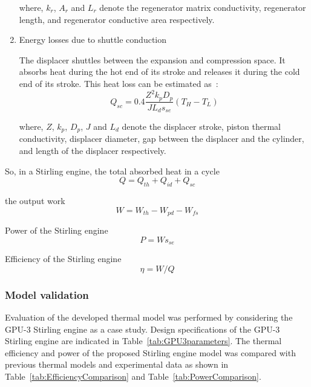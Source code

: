 \begin{enumerate}
where, $k_r$, $A_r$ and $L_r$ denote the regenerator matrix conductivity, regenerator length, and regenerator conductive area respectively.

\item Energy losses due to shuttle conduction

The displacer shuttles between the expansion and compression space. It absorbs heat during the hot end of its stroke and releases it during the cold end of its stroke. This heat loss can be estimated as~\cite{Timoumi2008}:
\begin{equation}
	Q_{sc} = 0.4\frac{Z^2k_pD_p}{JL_ds_{se}}(T_{H} - T_{L})
\end{equation}

where, $Z$, $k_p$, $D_p$, $J$ and $L_d$ denote the displacer stroke, piston thermal conductivity, displacer diameter, gap between the displacer and the cylinder, and length of the displacer respectively.

\end{enumerate}

So, in a Stirling engine, the total absorbed heat in a cycle
\begin{equation}
	Q = Q_{th} + Q_{id} + Q_{sc}
\end{equation}

the output work
\begin{equation}
	W = W_{th} - W_{pd} - W_{fs}
\end{equation}

Power of the Stirling engine
\begin{equation}
	P = Ws_{se}
	\label{Eq:P}
\end{equation}

Efficiency of the Stirling engine
\begin{equation}
	\eta = W/Q
	\label{Eq:eta}
\end{equation}


\subsubsection{Model validation}

Evaluation of the developed thermal model was performed by considering the GPU-3 Stirling engine as a case study. Design specifications of the GPU-3 Stirling engine are indicated in Table~\ref{tab:GPU3parameters}. The thermal efficiency and power of the proposed Stirling engine model was compared with previous thermal models and experimental data as shown in Table~\ref{tab:EfficiencyComparison} and Table~\ref{tab:PowerComparison}.

